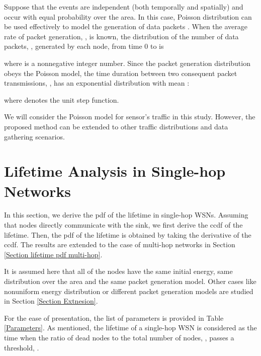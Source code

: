 \documentclass[conference]{IEEEtran}
\begin{document}
Suppose that the events are independent (both temporally and
spatially) and occur with equal probability over the area. In this
case, Poisson distribution can be used effectively to model the
generation of data packets \cite{Rai_Lifetime_Modeling_DATE}. When
the average rate of packet generation, , is known, the
distribution of the number of data packets, , generated by each
node, from time 0 to  is

where  is a nonnegative integer number. Since the packet
generation distribution obeys the Poisson model, the time duration
between two consequent packet transmissions, , has an exponential
distribution with mean :

where  denotes the unit step function.

We will consider the Poisson model for sensor's traffic in this
study. However, the proposed method can be extended to other traffic
distributions and data gathering scenarios.
\section{Lifetime Analysis in Single-hop Networks}\label{Section Prob Model Single Hop}
In this section, we derive the pdf of the lifetime in single-hop
WSNs. Assuming that nodes directly communicate with the sink, we
first derive the ccdf of the lifetime. Then, the pdf of the lifetime
is obtained by taking the derivative of the ccdf. The results are
extended to the case of multi-hop networks in Section \ref{Section
lifetime pdf multi-hop}.

It is assumed here that all of the nodes have the same initial
energy, same distribution over the area and the same packet
generation model. Other cases like nonuniform energy distribution or
different packet generation models are studied in Section
\ref{Section Extnesion}.

For the ease of presentation, the list of parameters is provided in
Table \ref{Parameters}. As mentioned, the lifetime of a single-hop
WSN is considered as the time when the ratio of dead nodes to the
total number of nodes, , passes a threshold, .
\end{document}
